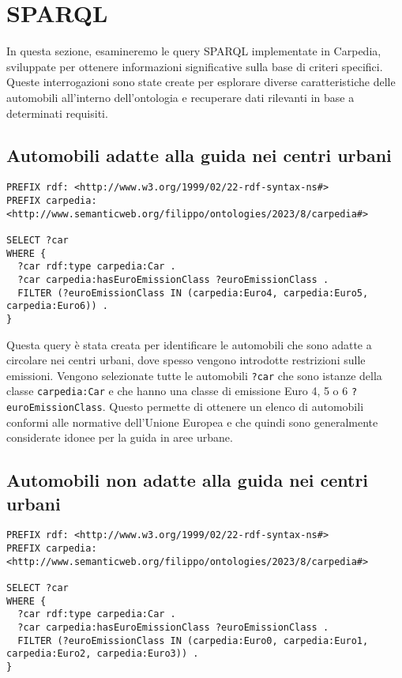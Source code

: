 \section{SPARQL}\label{sec:sparql}

In questa sezione, esamineremo le query SPARQL implementate in Carpedia, sviluppate per ottenere informazioni significative sulla base di criteri specifici.
Queste interrogazioni sono state create per esplorare diverse caratteristiche delle automobili all'interno
dell'ontologia e recuperare dati rilevanti in base a determinati requisiti.

\subsection{Automobili adatte alla guida nei centri urbani}

\begin{lstlisting}[language=SPARQL]
PREFIX rdf: <http://www.w3.org/1999/02/22-rdf-syntax-ns#>
PREFIX carpedia: <http://www.semanticweb.org/filippo/ontologies/2023/8/carpedia#>

SELECT ?car
WHERE {
  ?car rdf:type carpedia:Car .
  ?car carpedia:hasEuroEmissionClass ?euroEmissionClass .
  FILTER (?euroEmissionClass IN (carpedia:Euro4, carpedia:Euro5, carpedia:Euro6)) .
}
\end{lstlisting}

Questa query è stata creata per identificare le automobili che sono adatte a circolare nei centri urbani, dove spesso vengono introdotte restrizioni sulle emissioni.
Vengono selezionate tutte le automobili \texttt{?car} che sono istanze della classe \texttt{carpedia:Car} e che hanno una classe di emissione Euro 4, 5 o 6 \texttt{?euroEmissionClass}.
Questo permette di ottenere un elenco di automobili conformi alle normative dell'Unione Europea e che quindi sono generalmente considerate idonee per la guida in aree urbane.

\subsection{Automobili non adatte alla guida nei centri urbani}

\begin{lstlisting}[language=SPARQL]
PREFIX rdf: <http://www.w3.org/1999/02/22-rdf-syntax-ns#>
PREFIX carpedia: <http://www.semanticweb.org/filippo/ontologies/2023/8/carpedia#>

SELECT ?car
WHERE {
  ?car rdf:type carpedia:Car .
  ?car carpedia:hasEuroEmissionClass ?euroEmissionClass .
  FILTER (?euroEmissionClass IN (carpedia:Euro0, carpedia:Euro1, carpedia:Euro2, carpedia:Euro3)) .
}
\end{lstlisting}

